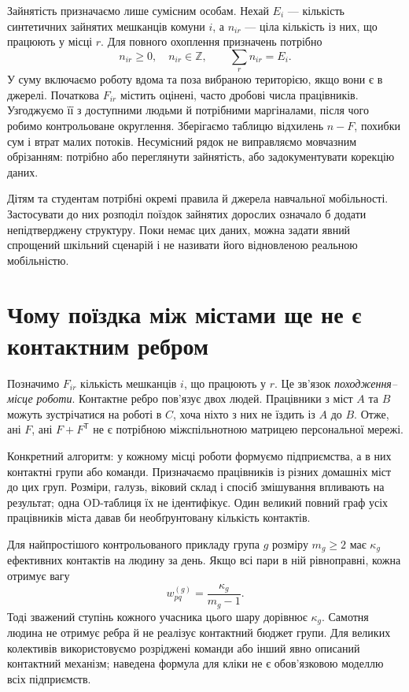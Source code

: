 \documentclass[11pt,a4paper]{article}
\begin{document}
Зайнятість призначаємо лише сумісним особам. Нехай $E_i$ --- кількість синтетичних зайнятих мешканців комуни $i$, а $n_{ir}$ --- ціла кількість із них, що працюють у місці $r$. Для повного охоплення призначень потрібно
\[
 n_{ir}\geq0,\quad n_{ir}\in\mathbb Z,\qquad \sum_r n_{ir}=E_i.
\]
У суму включаємо роботу вдома та поза вибраною територією, якщо вони є в джерелі. Початкова $F_{ir}$ містить оцінені, часто дробові числа працівників. Узгоджуємо її з доступними людьми й потрібними маргіналами, після чого робимо контрольоване округлення. Зберігаємо таблицю відхилень $n-F$, похибки сум і втрат малих потоків. Несумісний рядок не виправляємо мовчазним обрізанням: потрібно або переглянути зайнятість, або задокументувати корекцію даних.

Дітям та студентам потрібні окремі правила й джерела навчальної мобільності. Застосувати до них розподіл поїздок зайнятих дорослих означало б додати непідтверджену структуру. Поки немає цих даних, можна задати явний спрощений шкільний сценарій і не називати його відновленою реальною мобільністю.

\section{Чому поїздка між містами ще не є контактним ребром}
Позначимо $F_{ir}$ кількість мешканців $i$, що працюють у $r$. Це зв'язок \emph{походження--місце роботи}. Контактне ребро пов'язує двох людей. Працівники з міст $A$ та $B$ можуть зустрічатися на роботі в $C$, хоча ніхто з них не їздить із $A$ до $B$. Отже, ані $F$, ані $F+F^\mathsf{T}$ не є потрібною міжспільнотною матрицею персональної мережі.

Конкретний алгоритм: у кожному місці роботи формуємо підприємства, а в них контактні групи або команди. Призначаємо працівників із різних домашніх міст до цих груп. Розміри, галузь, віковий склад і спосіб змішування впливають на результат; одна OD-таблиця їх не ідентифікує. Один великий повний граф усіх працівників міста давав би необґрунтовану кількість контактів.

Для найпростішого контрольованого прикладу група $g$ розміру $m_g\geq2$ має $\kappa_g$ ефективних контактів на людину за день. Якщо всі пари в ній рівноправні, кожна отримує вагу
\[
 w_{pq}^{(g)}=\frac{\kappa_g}{m_g-1}.
\]
Тоді зважений ступінь кожного учасника цього шару дорівнює $\kappa_g$. Самотня людина не отримує ребра й не реалізує контактний бюджет групи. Для великих колективів використовуємо розріджені команди або інший явно описаний контактний механізм; наведена формула для кліки не є обов'язковою моделлю всіх підприємств.
\end{document}
